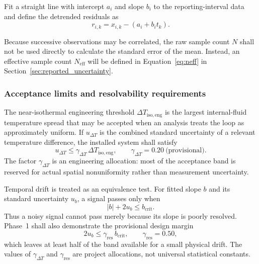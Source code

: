 \documentclass[11pt]{article}
\begin{document}
Fit a straight line with intercept $a_i$ and slope $b_i$ to the reporting-interval data and define the detrended residuals as
\begin{equation}
    r_{i,k}
    =
    x_{i,k}-\left(a_i+b_i t_k\right).
\end{equation}

Because successive observations may be correlated, the raw sample count $N$ shall not be used directly to calculate the standard error of the mean. Instead, an effective sample count $N_{\mathrm{eff}}$ will be defined in Equation~\eqref{eq:neff} in Section~\ref{sec:reported_uncertainty}.

\subsubsection{Acceptance limits and resolvability requirements}
\label{sec:resolvability}

The near-isothermal engineering threshold $\Delta T_{\mathrm{iso,eng}}$ is the largest internal-fluid temperature spread that may be accepted when an analysis treats the loop as approximately uniform. If $u_{\Delta T}$ is the combined standard uncertainty of a relevant temperature difference, the installed system shall satisfy
\begin{equation}
    u_{\Delta T}
    \leq
    \gamma_{\Delta T}\,\Delta T_{\mathrm{iso,eng}},
    \qquad
    \gamma_{\Delta T}=0.20\ \text{(provisional)}.
    \label{eq:iso_resolution_general}
\end{equation}
The factor $\gamma_{\Delta T}$ is an engineering allocation: most of the acceptance band is reserved for actual spatial nonuniformity rather than measurement uncertainty.

Temporal drift is treated as an equivalence test. For fitted slope $b$ and its standard uncertainty $u_b$, a signal passes only when
\begin{equation}
    |b|+2u_b\leq b_{\mathrm{crit}}.
    \label{eq:drift_equivalence}
\end{equation}
Thus a noisy signal cannot pass merely because its slope is poorly resolved. Phase~1 shall also demonstrate the provisional design margin
\begin{equation}
    2u_b
    \leq
    \gamma_{\mathrm{res}}\,b_{\mathrm{crit}},
    \qquad
    \gamma_{\mathrm{res}}=0.50,
    \label{eq:slope_resolution_general}
\end{equation}
which leaves at least half of the band available for a small physical drift. The values of $\gamma_{\Delta T}$ and $\gamma_{\mathrm{res}}$ are project allocations, not universal statistical constants.
\end{document}
